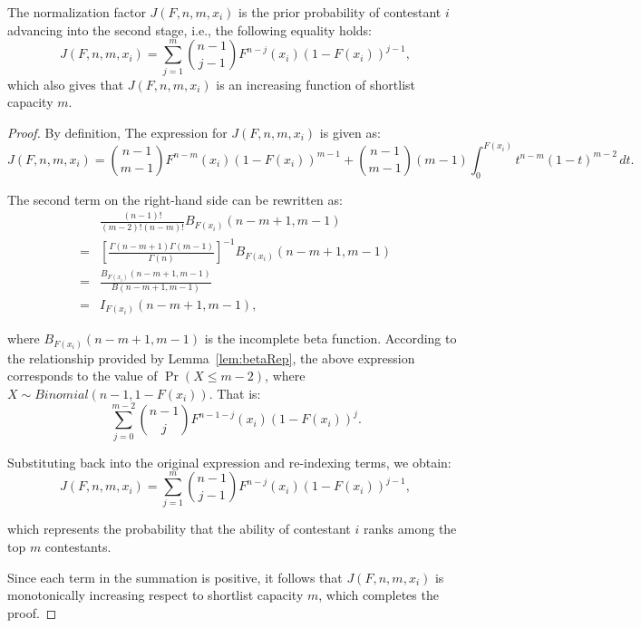 \begin{lemma} \label{lem:normal} The normalization factor $J(F,n,m,x_i)$ is the prior probability of contestant $i$ advancing into the second stage, i.e., the following equality holds:
\[
    J(F,n,m,x_i) = \sum_{j=1}^{m}\binom{n-1}{j-1}F^{n-j}(x_i)(1-F(x_i))^{j-1},
\]
which also gives that $J(F,n,m,x_i)$ is an increasing function of shortlist capacity $m$.    
\end{lemma}
\begin{proof}
By definition, The expression for \( J(F, n, m, x_i) \) is given as:
\[
J(F, n, m, x_i) = \binom{n-1}{m-1}F^{n-m}(x_i)(1-F(x_i))^{m-1} + \binom{n-1}{m-1}(m-1)\int_0^{F(x_i)}t^{n-m}(1-t)^{m-2} \, dt.
\]

The second term on the right-hand side can be rewritten as:
\[
\begin{aligned}
    & \frac{(n-1)!}{(m-2)!(n-m)!} B_{F(x_i)}(n-m+1, m-1) \\
    = & \left[ \frac{\Gamma(n-m+1)\Gamma(m-1)}{\Gamma(n)} \right]^{-1} B_{F(x_i)}(n-m+1, m-1) \\
    = & \frac{B_{F(x_i)}(n-m+1, m-1)}{B(n-m+1, m-1)} \\
    = & I_{F(x_i)}(n-m+1, m-1),
\end{aligned}
\]

where \( B_{F(x_i)}(n-m+1, m-1) \) is the incomplete beta function. According to the relationship provided by Lemma~\ref{lem:betaRep}, the above expression corresponds to the value of \( \Pr(X \leq m-2) \), where \( X \sim Binomial(n-1, 1-F(x_i)) \). That is:
\[
\sum_{j=0}^{m-2} \binom{n-1}{j} F^{n-1-j}(x_i)(1-F(x_i))^j.
\]

Substituting back into the original expression and re-indexing terms, we obtain:
\[
J(F, n, m, x_i) = \sum_{j=1}^{m}\binom{n-1}{j-1}F^{n-j}(x_i)(1-F(x_i))^{j-1},
\]

which represents the probability that the ability of contestant \( i \) ranks among the top \( m \) contestants.

Since each term in the summation is positive, it follows that \( J(F, n, m, x_i) \) is monotonically increasing respect to shortlist capacity $m$, which completes the proof.
\end{proof}


